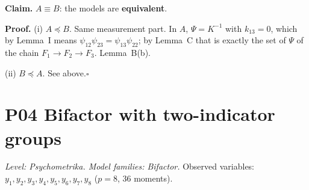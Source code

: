 \documentclass[10pt,a4paper]{article}
\newcommand{\nest}{\preceq}
\begin{document}
\par\bigskip
\noindent\textbf{Claim.} $A \equiv B$: the models are \textbf{equivalent}.\par\smallskip
\noindent\textbf{Proof.} (i) $A\nest B$. Same measurement part. In $A$, $\Psi=K^{-1}$ with $k_{13}=0$, which by Lemma~I means $\psi_{12}\psi_{23}=\psi_{13}\psi_{22}$; by Lemma~C that is exactly the set of $\Psi$ of the chain $F_1\to F_2\to F_3$. Lemma~B(b).\par\smallskip
\noindent(ii) $B\nest A$. See above.\hfill$\square$\par\medskip
{}

\clearpage
\section*{P04 \quad Bifactor with two-indicator groups}
\noindent\textit{Level: Psychometrika. Model families: Bifactor.} Observed variables: $y_{1}, y_{2}, y_{3}, y_{4}, y_{5}, y_{6}, y_{7}, y_{8}$ ($p=8$, 36 moments).\par\medskip
\end{document}

